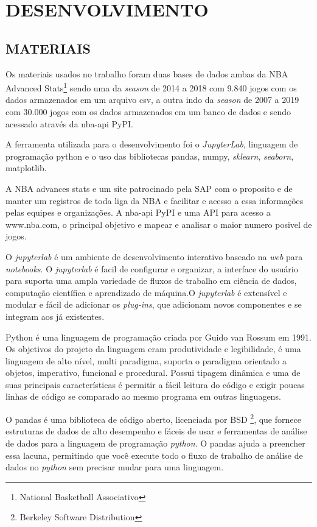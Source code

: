\section{DESENVOLVIMENTO}
\subsection{MATERIAIS}
Os materiais usados no trabalho foram duas bases de dados ambas da NBA Advanced Stats\footnote{National Basketball Associativo} sendo uma da \textit{season} de 2014 a 2018 com 9.840 jogos com os dados armazenados em um arquivo csv, a outra indo da \textit{season} de 2007 a 2019 com 30.000 jogos com os dados armazenados em um banco de dados e sendo acessado através da nba-api PyPI. 

A ferramenta utilizada para o desenvolvimento foi o \textit{JupyterLab}, linguagem de programação {python} e o uso das bibliotecas  pandas, numpy, \textit{sklearn}, \textit{seaborn}, matplotlib.

A NBA advances stats e um site patrocinado pela SAP com o proposito e de manter um registros de toda liga da NBA e facilitar e acesso a essa informações pelas equipes e organizações. A nba-api PyPI e uma API para acesso a www.nba.com, o principal objetivo e mapear e analisar o maior numero posivel de jogos.

O \textit{jupyterlab} é um ambiente de desenvolvimento interativo baseado na \textit{web} para \textit{notebooks}. O \textit{jupyterlab} é facil de configurar e organizar, a interface do usuário para suporta uma ampla variedade de fluxos de trabalho em ciência de dados, computação científica e aprendizado de máquina.O \textit{jupyterlab} é extensível e modular e fácil de adicionar os \textit{plug-ins}, que adicionam novos componentes e se integram aos já existentes\cite{jupyter}.

Python é uma linguagem de programação criada por Guido van Rossum em 1991. Os objetivos do projeto da linguagem eram produtividade e legibilidade, é uma linguagem de alto nível, multi paradigma, suporta o paradigma orientado a objetos, imperativo, funcional e procedural. Possui tipagem dinâmica e uma de suas principais características é permitir a fácil leitura do código e exigir poucas linhas de código se comparado ao mesmo programa em outras linguagens\cite{python}.

O pandas é uma biblioteca de código aberto, licenciada por BSD \footnote{Berkeley Software Distribution}, que fornece estruturas de dados de alto desempenho e fáceis de usar e ferramentas de análise de dados para a linguagem de programação \textit{python}. O pandas ajuda a preencher essa lacuna, permitindo que você execute todo o fluxo de trabalho de análise de dados no \textit{python} sem precisar mudar para uma linguagem\cite{pandas}.

